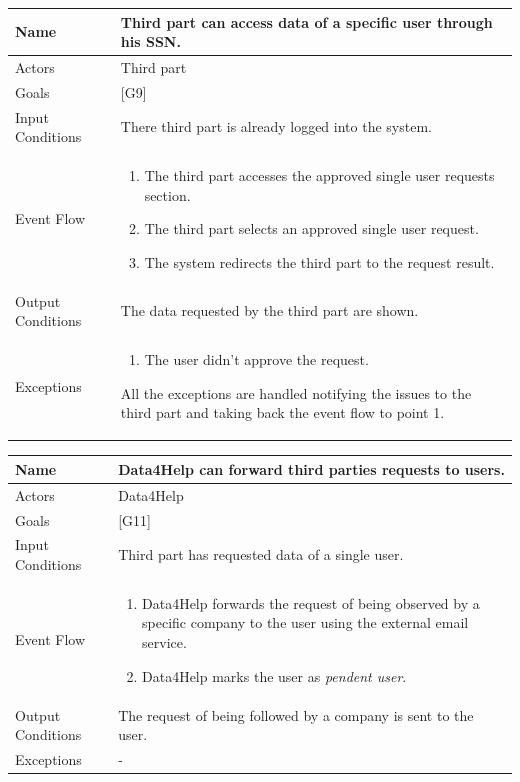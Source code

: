 \documentclass{article}
\begin{document}
\begin{center}
    \begin{tabular}{ | l | p{10cm} |}
    \hline
    Name & Third part can access data of a specific user through his SSN.\\ \hline
    Actors & Third part\\ \hline
   	Goals & {[G9]}\\ \hline
    Input Conditions & There third part is already logged into the system.\\ \hline
    Event Flow & \begin{enumerate}
    	\item The third part accesses the approved single user requests section.
    	\item The third part selects an approved single user request. 
    	\item The system redirects the third part to the request result.
    \end{enumerate} \\ \hline
    Output Conditions & The data requested by the third part are shown.  \\ \hline
    Exceptions & \begin{enumerate}
   \item The user didn't approve the request.
\end{enumerate} All the exceptions are handled notifying the issues to the third part and taking back the event flow to point 1.    \\ \hline
    \end{tabular}
\end{center}

\begin{center}
    \begin{tabular}{ | l | p{10cm} |}
    \hline
    Name & Data4Help can forward third parties requests to users. \\ \hline
    Actors & Data4Help\\ \hline
   	Goals & {[G11]}\\ \hline
    Input Conditions & Third part has requested data of a single user.\\ \hline
    Event Flow & \begin{enumerate}
    	\item Data4Help forwards the request of being observed by a specific company to the user using the external email service.
    	\item Data4Help marks the user as \emph{pendent user}.
    \end{enumerate} \\ \hline
    Output Conditions & The request of being followed by a company is sent to the user. \\ \hline
    Exceptions & -    \\ \hline
    \end{tabular}
\end{center}
\end{document}
